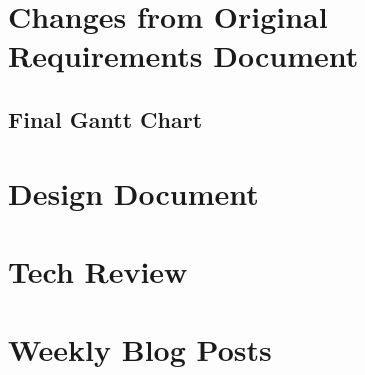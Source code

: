 \documentclass[10pt,letterpaper,onecolumn,draftclsnofoot]{IEEEtran}
\begin{document}
\section{Changes from Original Requirements Document}
\subsection{Final Gantt Chart}

\section{Design Document}


\section{Tech Review}

\section{Weekly Blog Posts}
\end{document}
